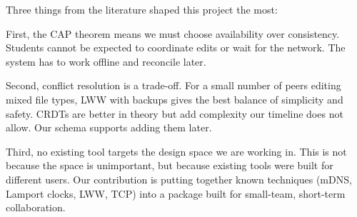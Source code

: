 Three things from the literature shaped this project the most:

First, the CAP theorem means we must choose availability over consistency. Students cannot be expected to coordinate edits or wait for the network. The system has to work offline and reconcile later.

Second, conflict resolution is a trade-off. For a small number of peers editing mixed file types, LWW with backups gives the best balance of simplicity and safety. CRDTs are better in theory but add complexity our timeline does not allow. Our schema supports adding them later.

Third, no existing tool targets the design space we are working in. This is not because the space is unimportant, but because existing tools were built for different users. Our contribution is putting together known techniques (mDNS, Lamport clocks, LWW, TCP) into a package built for small-team, short-term collaboration.
